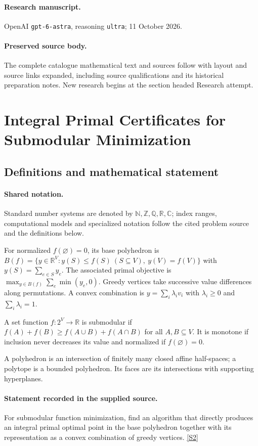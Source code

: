 \documentclass[11pt]{article}
\begin{document}
\paragraph{Research manuscript.} OpenAI \texttt{gpt-6-astra}, reasoning \texttt{ultra}; 11 October 2026.
\paragraph{Preserved source body.} The complete catalogue mathematical text and sources follow with layout and source links expanded, including source qualifications and its historical preparation notes. New research begins at the section headed Research attempt.

\section{Integral Primal Certificates for Submodular Minimization}\label{statement}

\subsection{Definitions and mathematical statement}

\paragraph{Shared notation.}Standard number systems are denoted by $\mathbb N,\mathbb Z,\mathbb Q,\mathbb R,\mathbb C$; index ranges, computational models and specialized notation follow the cited problem source and the definitions below.


For normalized $f(\varnothing)=0$, its base polyhedron is $B(f)=\{y\in\mathbb R^V:y(S)\leq f(S)\ (S\subseteq V),\ y(V)=f(V)\}$ with $y(S)=\sum_{e\in S}y_e$. The associated primal objective is $\max_{y\in B(f)}\sum_e\min(y_e,0)$. Greedy vertices take successive value differences along permutations. A convex combination is $y=\sum_i\lambda_i v_i$ with $\lambda_i\geq0$ and $\sum_i\lambda_i=1$.

A set function $f:2^V\to\mathbb R$ is submodular if $f(A)+f(B)\geq f(A\cup B)+f(A\cap B)$ for all $A,B\subseteq V$. It is monotone if inclusion never decreases its value and normalized if $f(\varnothing)=0$.

A polyhedron is an intersection of finitely many closed affine half-spaces; a polytope is a bounded polyhedron. Its faces are its intersections with supporting hyperplanes.
\paragraph{Statement recorded in the supplied source.}
For submodular function minimization, find an algorithm that directly produces an integral primal optimal point in the base polyhedron together with its representation as a convex combination of greedy vertices. \href{https://doi.org/10.4171/owr/2005/50}{[S2]}
\end{document}
